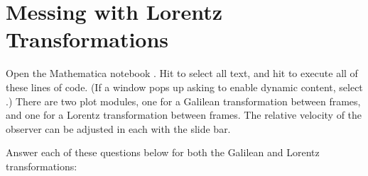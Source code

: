 \section{Messing with Lorentz Transformations}

\makelabheader %

\bigskip

Open the Mathematica notebook .  Hit  to select all text, and
hit  to execute all of these lines of code. (If a window pops up asking to enable
dynamic content, select .)  There are two plot modules, one for a Galilean transformation between frames, and one for a Lorentz transformation between frames.  The relative velocity of the observer can be adjusted in each with the slide bar. 
\medskip

Answer each of these questions below for both the Galilean and Lorentz transformations:

